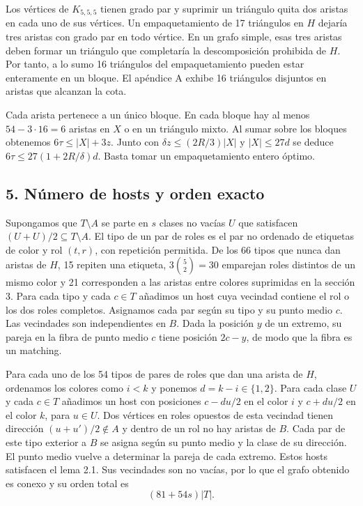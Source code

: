 \documentclass[spanish,11pt,a4paper]{article}
\begin{document}
Los vértices de \(K_{5,5,5}\) tienen grado par y suprimir un triángulo quita dos aristas en cada uno de sus vértices. Un empaquetamiento de 17 triángulos en \(H\) dejaría tres aristas con grado par en todo vértice. En un grafo simple, esas tres aristas deben formar un triángulo que completaría la descomposición prohibida de \(H\). Por tanto, a lo sumo 16 triángulos del empaquetamiento pueden estar enteramente en un bloque. El apéndice A exhibe 16 triángulos disjuntos en aristas que alcanzan la cota.

Cada arista pertenece a un único bloque. En cada bloque hay al menos \(54-3\cdot16=6\) aristas en \(X\) o en un triángulo mixto. Al sumar sobre los bloques obtenemos \(6\tau\le |X|+3z\). Junto con \(\delta z\le (2R/3)|X|\) y \(|X|\le27d\) se deduce \(6\tau\le27(1+2R/\delta)d\). Basta tomar un empaquetamiento entero óptimo.

\subsection{5. Número de hosts y orden exacto}\label{nuxfamero-de-hosts-y-orden-exacto}

Supongamos que \(T\setminus A\) se parte en \(s\) clases no vacías \(U\) que satisfacen \((U+U)/2\subseteq T\setminus A\). El tipo de un par de roles es el par no ordenado de etiquetas de color y rol \((t,r)\), con repetición permitida. De los 66 tipos que nunca dan aristas de \(H\), 15 repiten una etiqueta, \(3\binom52=30\) emparejan roles distintos de un mismo color y 21 corresponden a las aristas entre colores suprimidas en la sección 3. Para cada tipo y cada \(c\in T\) añadimos un host cuya vecindad contiene el rol o los dos roles completos. Asignamos cada par según su tipo y su punto medio \(c\). Las vecindades son independientes en \(B\). Dada la posición \(y\) de un extremo, su pareja en la fibra de punto medio \(c\) tiene posición \(2c-y\), de modo que la fibra es un matching.

Para cada uno de los 54 tipos de pares de roles que dan una arista de \(H\), ordenamos los colores como \(i<k\) y ponemos \(d=k-i\in\{1,2\}\). Para cada clase \(U\) y cada \(c\in T\) añadimos un host con posiciones \(c-du/2\) en el color \(i\) y \(c+du/2\) en el color \(k\), para \(u\in U\). Dos vértices en roles opuestos de esta vecindad tienen dirección \((u+u')/2\notin A\) y dentro de un rol no hay aristas de \(B\). Cada par de este tipo exterior a \(B\) se asigna según su punto medio y la clase de su dirección. El punto medio vuelve a determinar la pareja de cada extremo. Estos hosts satisfacen el lema 2.1. Sus vecindades son no vacías, por lo que el grafo obtenido es conexo y su orden total es
\[(81+54s)|T|.\]
\end{document}
